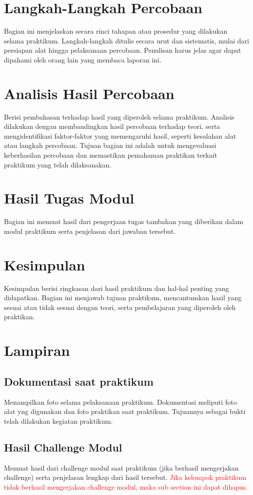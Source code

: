 \section{Langkah-Langkah Percobaan}
Bagian ini menjelaskan secara rinci tahapan atau prosedur yang dilakukan selama praktikum. Langkah-langkah ditulis secara urut dan sistematis, mulai dari persiapan alat hingga pelaksanaan percobaan. Penulisan harus jelas agar dapat dipahami oleh orang lain yang membaca laporan ini.

\section{Analisis Hasil Percobaan}
Berisi pembahasan terhadap hasil yang diperoleh selama praktikum. Analisis dilakukan dengan membandingkan hasil percobaan terhadap teori, serta mengidentifikasi faktor-faktor yang memengaruhi hasil, seperti kesalahan alat atau langkah percobaan. Tujuan bagian ini adalah untuk mengevaluasi keberhasilan percobaan dan memastikan pemahaman praktikan terkait praktikum yang telah dilaksanakan.

\section{Hasil Tugas Modul}
Bagian ini memuat hasil dari pengerjaan tugas tambahan yang diberikan dalam modul praktikum serta penjelasan dari jawaban tersebut. 

\section{Kesimpulan}
Kesimpulan berisi ringkasan dari hasil praktikum dan hal-hal penting yang didapatkan. Bagian ini menjawab tujuan praktikum, mencantumkan hasil yang sesuai atau tidak sesuai dengan teori, serta pembelajaran yang diperoleh oleh praktikan.

\section{Lampiran}
\subsection{Dokumentasi saat praktikum}
Menampilkan foto selama pelaksanaan praktikum. Dokumentasi meliputi foto alat yng digunakan dan foto praktikan saat praktikum. Tujuannya sebagai bukti telah dilakukan kegiatan praktikum.

\subsection{Hasil Challenge Modul}
Memuat hasil dari challenge modul saat praktikum (jika berhasil mengerjakan challenge) serta penjelasan lengkap dari hasil tersebut. 
\textcolor{red}{Jika kelompok praktikum tidak berhasil mengerjakan challenge modul, maka sub section ini dapat dihapus.}
